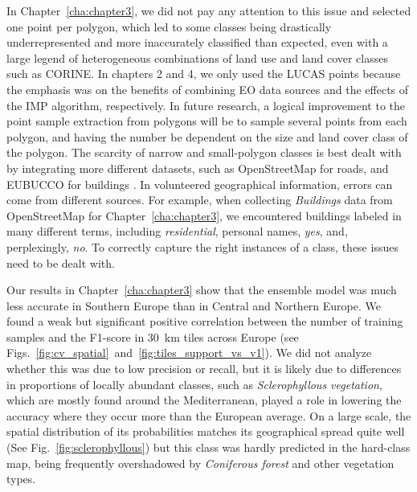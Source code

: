         In Chapter\@~\ref{cha:chapter3}, we did not pay any attention to this issue and selected one point per polygon, which led to some classes being drastically underrepresented and more inaccurately classified than expected, even with a large legend of heterogeneous combinations of land use and land cover classes such as CORINE. In chapters 2 and 4, we only used the LUCAS points because the emphasis was on the benefits of combining EO data sources and the effects of the IMP algorithm, respectively. In future research, a logical improvement to the point sample extraction from polygons will be to sample several points from each polygon, and having the number be dependent on the size and land cover class of the polygon. The scarcity of narrow and small-polygon classes is best dealt with by integrating more different datasets, such as OpenStreetMap for roads, and EUBUCCO for buildings \citep{milojevic2023eubucco}. In volunteered geographical information, errors can come from different sources. For example, when collecting \textit{Buildings} data from OpenStreetMap for Chapter\@~\ref{cha:chapter3}, we encountered buildings labeled in many different terms, including \textit{residential}, personal names, \textit{yes}, and, perplexingly, \textit{no}. To correctly capture the right instances of a class, these issues need to be dealt with.
        
        Our results in Chapter\@~\ref{cha:chapter3} show that the ensemble model was much less accurate in Southern Europe than in Central and Northern Europe. We found a weak but significant positive correlation between the number of training samples and the F1-score in 30~km tiles across Europe (see Figs.\@~\ref{fig:cv_spatial}\@~and\@~\ref{fig:tiles_support_vs_v1}). We did not analyze whether this was due to low precision or recall, but it is likely due to differences in proportions of locally abundant classes, such as \textit{Sclerophyllous vegetation}, which are mostly found around the Mediterranean, played a role in lowering the accuracy where they occur more than the European average. On a large scale, the spatial distribution of its probabilities matches its geographical spread quite well (See Fig.\@~\ref{fig:sclerophyllous}) but this class was hardly predicted in the hard-class map, being frequently overshadowed by \textit{Coniferous forest} and other vegetation types.  


